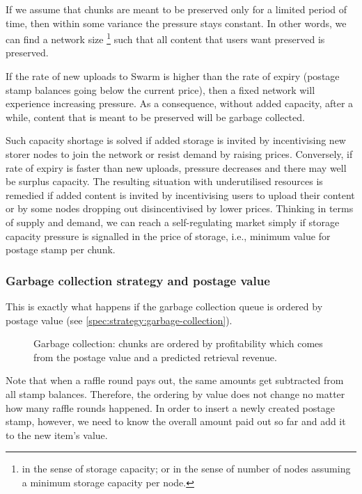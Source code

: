 If we assume that chunks are meant to be preserved only for a limited period of time, then within some variance the pressure stays constant. In other words, we can find a network size%
%
\footnote{in the sense of storage capacity; or in the sense of number of nodes assuming a minimum storage capacity per node.}
%
such that all content that users want preserved is preserved. 

If the rate of new uploads to Swarm is higher than the rate of expiry (postage stamp balances going below the current price), then a fixed network will experience increasing pressure. As a consequence, without added capacity, after a while, content that is meant to be preserved will be garbage collected. 

Such capacity shortage is solved if added storage is invited by incentivising new storer nodes to join the network or resist demand by raising prices. Conversely, if rate of expiry is faster than new uploads, pressure decreases and there may well be surplus capacity. The resulting situation with underutilised resources is remedied if added content is invited by incentivising users to upload their content or by some nodes dropping out disincentivised by lower prices. Thinking in terms of supply and demand, we can reach a self-regulating market simply if storage capacity pressure is signalled in the price of storage, i.e., minimum value for postage stamp per chunk. 

\subsubsection{Garbage collection strategy and postage value}

This is exactly what happens if the garbage collection queue is ordered by postage value (see \ref{spec:strategy:garbage-collection}).

\begin{figure}[htbp]
  \centering
  \caption{Garbage collection: chunks are ordered by profitability which comes from the postage value and a predicted retrieval revenue.}
  \label{fig:garbage-collection}
\end{figure}


Note that when a raffle round pays out, the same amounts get subtracted from all stamp balances. Therefore, the ordering by value does not change no matter how many raffle rounds happened. In order to insert a newly created postage stamp, however, we need to know the overall amount paid out so far and add it to the new item's value.

